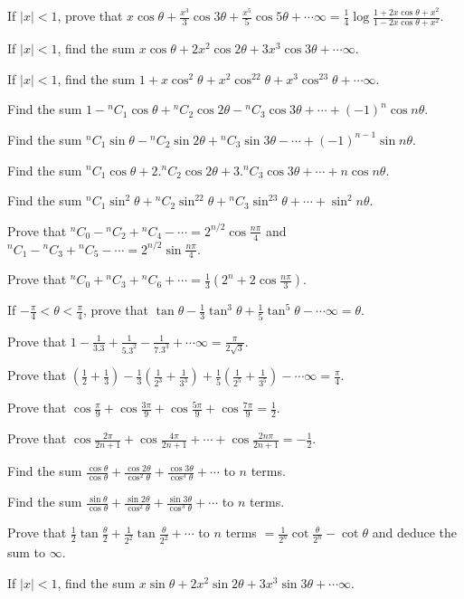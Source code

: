 \item If $|x| < 1$, prove that $x\cos\theta + \frac{x^3}{3}\cos3\theta + \frac{x^5}{5}\cos5\theta + \cdots
  \infty = \frac{1}{4}\log\frac{1 + 2x\cos\theta + x^2}{1 - 2x\cos\theta + x^2}$.
\item If $|x| < 1$, find the sum $x\cos\theta + 2x^2\cos2\theta + 3x^3\cos3\theta + \cdots \infty$.
\item If $|x| < 1$, find the sum $1 + x\cos^2\theta + x^2\cos^22\theta + x^3\cos^23\theta + \cdots \infty$.
\item Find the sum $1 - {}^nC_1\cos\theta + {}^nC_2\cos2\theta - {}^nC_3\cos3\theta + \cdots + (-1)^n\cos
  n\theta$.
\item Find the sum ${}^nC_1\sin\theta - {}^nC_2\sin2\theta + {}^nC_3\sin3\theta - \cdots + (-1)^{n -
    1}\sin n\theta$.
\item Find the sum ${}^nC_1\cos\theta + 2.{}^nC_2\cos2\theta + 3.{}^nC_3\cos3\theta + \cdots + n\cos
  n\theta$.
\item Find the sum ${}^nC_1\sin^2\theta + {}^nC_2\sin^22\theta + {}^nC_3\sin^23\theta + \cdots + \sin^2
  n\theta$.
\item Prove that ${}^nC_0 - {}^nC_2 + {}^nC_4 - \cdots = 2^{n/2}\cos\frac{n\pi}{4}$ and ${}^nC_1 - {}^nC_3 +
  {}^nC_5 - \cdots = 2^{n/2}\sin\frac{n\pi}{4}$.
\item Prove that ${}^nC_0 + {}^nC_3 + {}^nC_6 + \cdots = \frac{1}{3}\left(2^n + 2\cos\frac{n\pi}{3}\right)$.
\item If $-\frac{\pi}{4} < \theta < \frac{\pi}{4}$, prove that $\tan\theta - \frac{1}{3}\tan^3\theta +
  \frac{1}{5}\tan^5\theta - \cdots \infty = \theta$.
\item Prove that $1 - \frac{1}{3.3} + \frac{1}{5.3^2} - \frac{1}{7.3^3} + \cdots \infty =
  \frac{\pi}{2\sqrt{3}}$.
\item Prove that $\left(\frac{1}{2} + \frac{1}{3}\right) - \frac{1}{3}\left(\frac{1}{2^3} +
  \frac{1}{3^3}\right) + \frac{1}{5}\left(\frac{1}{2^5} + \frac{1}{3^5}\right) - \cdots \infty =
  \frac{\pi}{4}$.
\item Prove that $\cos\frac{\pi}{9} + \cos\frac{3\pi}{9} + \cos\frac{5\pi}{9} + \cos\frac{7\pi}{9} =
  \frac{1}{2}$.
\item Prove that $\cos\frac{2\pi}{2n + 1} + \cos\frac{4\pi}{2n + 1} + \cdots + \cos\frac{2n\pi}{2n + 1} =
  -\frac{1}{2}$.
\item Find the sum $\frac{\cos\theta}{\cos\theta} + \frac{\cos2\theta}{\cos^2\theta} +
  \frac{\cos3\theta}{\cos^3\theta} + \cdots$ to $n$ terms.
\item Find the sum $\frac{\sin\theta}{\cos\theta} + \frac{\sin2\theta}{\cos^2\theta} +
  \frac{\sin3\theta}{\cos^3\theta} + \cdots$ to $n$ terms.
\item Prove that $\frac{1}{2}\tan\frac{\theta}{2} + \frac{1}{2^2}\tan\frac{\theta}{2^2} + \cdots$ to $n$ terms
  $= \frac{1}{2^n}\cot\frac{\theta}{2^n} - \cot\theta$ and deduce the sum to $\infty$.
\item If $|x| < 1$, find the sum $x\sin\theta + 2x^2\sin2\theta + 3x^3\sin3\theta + \cdots \infty$.
\stopitemize